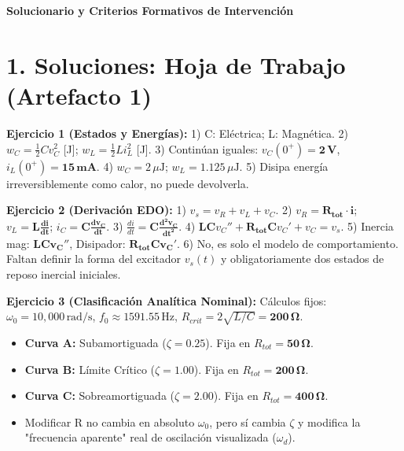 \documentclass[11pt, a4paper]{article}
\begin{document}
\begin{tcolorbox}[colback=ucbblue!5!white, colframe=ucbblue, title=\textbf{Clave Exclusiva para el Instructor: Taller RLC (W12S2)}]
    \centering \textbf{Solucionario y Criterios Formativos de Intervención}
\end{tcolorbox}

\section*{1. Soluciones: Hoja de Trabajo (Artefacto 1)}
\textbf{Ejercicio 1 (Estados y Energías):} 
1) C: Eléctrica; L: Magnética. 2) $w_C = \frac{1}{2}Cv_C^2$ [J]; $w_L = \frac{1}{2}Li_L^2$ [J]. 3) Continúan iguales: $v_C(0^+) = \mathbf{2\,\text{V}}$, $i_L(0^+) = \mathbf{15\,\text{mA}}$. 4) $w_C = 2\,\mu\text{J}$; $w_L = 1.125\,\mu\text{J}$. 5) Disipa energía irreversiblemente como calor, no puede devolverla.

\textbf{Ejercicio 2 (Derivación EDO):} 
1) $v_s = v_R + v_L + v_C$. 2) $v_R = \mathbf{R_{tot} \cdot i}$; $v_L = \mathbf{L \frac{di}{dt}}$; $i_C = \mathbf{C \frac{dv_C}{dt}}$. 3) $\frac{di}{dt} = \mathbf{C \frac{d^2v_C}{dt^2}}$. 4) $\mathbf{LC}v_C'' + \mathbf{R_{tot}C}v_C' + v_C = v_s$. 5) Inercia mag: $\mathbf{LCv_C''}$, Disipador: $\mathbf{R_{tot}Cv_C'}$. 6) No, es solo el modelo de comportamiento. Faltan definir la forma del excitador $v_s(t)$ y obligatoriamente dos estados de reposo inercial iniciales.

\textbf{Ejercicio 3 (Clasificación Analítica Nominal):}
Cálculos fijos: $\omega_0 = 10,000\,\text{rad/s}$, $f_0 \approx 1591.55\,\text{Hz}$, $R_{crit} = 2\sqrt{L/C} = \mathbf{200\,\Omega}$.
\begin{itemize}
    \item \textbf{Curva A:} Subamortiguada ($\zeta = 0.25$). Fija en $R_{tot} = \mathbf{50\,\Omega}$.
    \item \textbf{Curva B:} Límite Crítico ($\zeta = 1.00$). Fija en $R_{tot} = \mathbf{200\,\Omega}$.
    \item \textbf{Curva C:} Sobreamortiguada ($\zeta = 2.00$). Fija en $R_{tot} = \mathbf{400\,\Omega}$.
    \item Modificar R no cambia en absoluto $\omega_0$, pero sí cambia $\zeta$ y modifica la "frecuencia aparente" real de oscilación visualizada ($\omega_d$).
\end{itemize}
\end{document}
